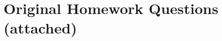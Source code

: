 \documentclass[final,3p,times]{elsarticle}
\begin{document}
	

	
\appendix

\section{Original Homework Questions (attached)}
	


%
%
%
%	
%	
%
%
%
%
%
%
\end{document}
